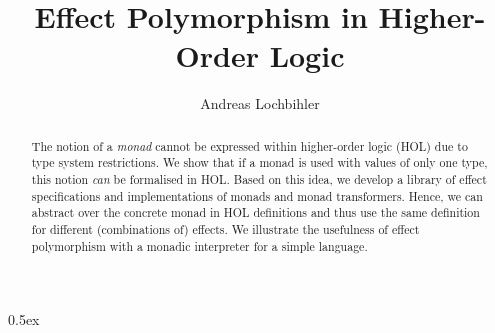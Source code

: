 \documentclass[11pt,a4paper]{article}
\begin{document}
\title{Effect Polymorphism in Higher-Order Logic}
\author{Andreas Lochbihler}
\maketitle

\begin{abstract}
  The notion of a \emph{monad} cannot be expressed within higher-order logic (HOL) due to type system restrictions.
  We show that if a monad is used with values of only one type, this notion \emph{can} be formalised in HOL.
  Based on this idea, we develop a library of effect specifications and implementations of monads and monad transformers.
  Hence, we can abstract over the concrete monad in HOL definitions and thus use the same definition for different (combinations of) effects.
  We illustrate the usefulness of effect polymorphism with a monadic interpreter for a simple language.
\end{abstract}

\tableofcontents

\newpage

\parindent 0pt\parskip 0.5ex



%
%
\end{document}
